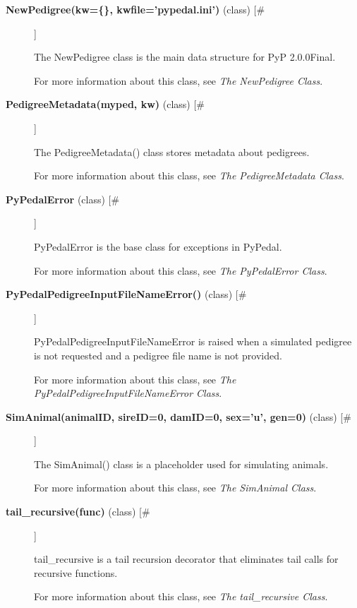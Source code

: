 \begin{description}
\item[\textbf{NewPedigree(kw=\{\}, kwfile='pypedal.ini')} (class) [\#]
]
\par The NewPedigree class is the main data structure for PyP 2.0.0Final.
\par For more information about this class, see \textit{The NewPedigree Class}.

\item[\textbf{PedigreeMetadata(myped, kw)} (class) [\#]
]
\par The PedigreeMetadata() class stores metadata about pedigrees.
\par For more information about this class, see \textit{The PedigreeMetadata Class}.

\item[\textbf{PyPedalError} (class)  [\#]
]
\par PyPedalError is the base class for exceptions in PyPedal.
\par For more information about this class, see \textit{The PyPedalError Class}.

\item[\textbf{PyPedalPedigreeInputFileNameError()} (class) [\#]
]
\par PyPedalPedigreeInputFileNameError is raised when a simulated pedigree
is not requested and a pedigree file name is not provided.
\par For more information about this class, see \textit{The PyPedalPedigreeInputFileNameError Class}.

\item[\textbf{SimAnimal(animalID, sireID=0, damID=0, sex='u', gen=0)} (class) [\#]
]
\par The SimAnimal() class is a placeholder used for simulating animals.
\par For more information about this class, see \textit{The SimAnimal Class}.

\item[\textbf{tail\_recursive(func)} (class) [\#]
]
\par tail\_recursive is a tail recursion decorator that eliminates tail calls
for recursive functions.
\par For more information about this class, see \textit{The tail\_recursive Class}.

\end{description}
